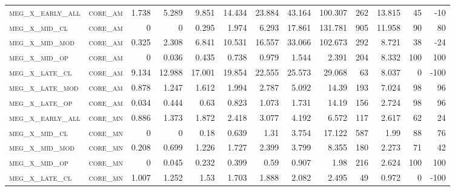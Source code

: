 \begin{landscape}
\begin{center}
\begin{footnotesize}
\begin{longtable}{llrrrrrrrr|rrr}
\textsc{meg\_x\_early\_all} & \textsc{core\_am  }   & 1.738    & 5.289    & 9.851    & 14.434   & 23.884   & 43.164   & 100.307   & 262    & 13.815        & 45            & -10             \\
\textsc{meg\_x\_mid\_cl   } & \textsc{core\_am  }   & 0        & 0        & 0.295    & 1.974    & 6.293    & 17.861   & 131.781   & 905    & 11.958        & 90            & 80              \\
\textsc{meg\_x\_mid\_mod  } & \textsc{core\_am  }   & 0.325    & 2.308    & 6.841    & 10.531   & 16.557   & 33.066   & 102.673   & 292    & 8.721         & 38            & -24             \\
\textsc{meg\_x\_mid\_op   } & \textsc{core\_am  }   & 0        & 0.036    & 0.435    & 0.738    & 0.979    & 1.544    & 2.391     & 204    & 8.332         & 100           & 100             \\
\textsc{meg\_x\_late\_cl  } & \textsc{core\_am  }   & 9.134    & 12.988   & 17.001   & 19.854   & 22.555   & 25.573   & 29.068    & 63     & 8.037         & 0             & -100            \\
\textsc{meg\_x\_late\_mod } & \textsc{core\_am  }   & 0.878    & 1.247    & 1.612    & 1.994    & 2.787    & 5.092    & 14.39     & 193    & 7.024         & 98            & 96              \\
\textsc{meg\_x\_late\_op  } & \textsc{core\_am  }   & 0.034    & 0.444    & 0.63     & 0.823    & 1.073    & 1.731    & 14.19     & 156    & 2.724         & 98            & 96              \\
\textsc{meg\_x\_early\_all} & \textsc{core\_mn  }   & 0.886    & 1.373    & 1.872    & 2.418    & 3.077    & 4.192    & 6.572     & 117    & 2.617         & 62            & 24              \\
\textsc{meg\_x\_mid\_cl   } & \textsc{core\_mn  }   & 0        & 0        & 0.18     & 0.639    & 1.31     & 3.754    & 17.122    & 587    & 1.99          & 88            & 76              \\
\textsc{meg\_x\_mid\_mod  } & \textsc{core\_mn  }   & 0.208    & 0.699    & 1.226    & 1.727    & 2.399    & 3.799    & 8.355     & 180    & 2.273         & 71            & 42              \\
\textsc{meg\_x\_mid\_op   } & \textsc{core\_mn  }   & 0        & 0.045    & 0.232    & 0.399    & 0.59     & 0.907    & 1.98      & 216    & 2.624         & 100           & 100             \\
\textsc{meg\_x\_late\_cl  } & \textsc{core\_mn  }   & 1.007    & 1.252    & 1.53     & 1.703    & 1.888    & 2.082    & 2.495     & 49     & 0.972         & 0             & -100            \\

\end{longtable}
\end{footnotesize}
\end{center}
\end{landscape}
